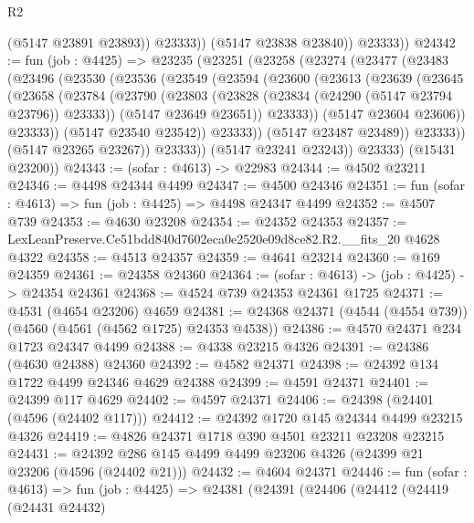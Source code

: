 \begin{lexlean}{R2}
\begin{coremodule}
                (@5147 @23891 @23893))
              @23333))
          (@5147 @23838 @23840))
        @23333))
@24342 := fun (job : @4425) =>
  @23235
    (@23251
      (@23258
        (@23274
          (@23477
            (@23483
              (@23496
                (@23530
                  (@23536
                    (@23549
                      (@23594
                        (@23600
                          (@23613
                            (@23639
                              (@23645
                                (@23658
                                  (@23784
                                    (@23790
                                      (@23803
                                        (@23828 (@23834 (@24290 (@5147 @23794 @23796)) @23333))
                                        (@5147 @23649 @23651))
                                      @23333))
                                  (@5147 @23604 @23606))
                                @23333))
                            (@5147 @23540 @23542))
                          @23333))
                      (@5147 @23487 @23489))
                    @23333))
                (@5147 @23265 @23267))
              @23333))
          (@5147 @23241 @23243))
        @23333)
      (@15431 @23200))
@24343 := (sofar : @4613) -> @22983
@24344 := @4502 @23211
@24346 := @4498 @24344 @4499
@24347 := @4500 @24346
@24351 := fun (sofar : @4613) => fun (job : @4425) => @4498 @24347 @4499
@24352 := @4507 @739
@24353 := @4630 @23208
@24354 := @24352 @24353
@24357 := LexLeanPreserve.Ce51bdd840d7602eca0e2520e09d8ce82.R2.__fits_20 @4628 @4322
@24358 := @4513 @24357
@24359 := @4641 @23214
@24360 := @169 @24359
@24361 := @24358 @24360
@24364 := (sofar : @4613) -> (job : @4425) -> @24354 @24361
@24368 := @4524 @739 @24353 @24361 @1725
@24371 := @4531 (@4654 @23206) @4659
@24381 := @24368 @24371 (@4544 (@4554 @739)) (@4560 (@4561 (@4562 @1725) @24353 @4538))
@24386 := @4570 @24371 @234 @1723 @24347 @4499
@24388 := @4338 @23215 @4326
@24391 := @24386 (@4630 @24388) @24360
@24392 := @4582 @24371
@24398 := @24392 @134 @1722 @4499 @24346 @4629 @24388
@24399 := @4591 @24371
@24401 := @24399 @117 @4629
@24402 := @4597 @24371
@24406 := @24398 (@24401 (@4596 (@24402 @117)))
@24412 := @24392 @1720 @145 @24344 @4499 @23215 @4326
@24419 := @4826 @24371 @1718 @390 @4501 @23211 @23208 @23215
@24431 := @24392 @286 @145 @4499 @4499 @23206 @4326 (@24399 @21 @23206 (@4596 (@24402 @21)))
@24432 := @4604 @24371
@24446 := fun (sofar : @4613) =>
  fun (job : @4425) =>
  @24381
    (@24391
      (@24406
        (@24412
          (@24419
            (@24431 @24432)

\end{coremodule}
\end{lexlean}
